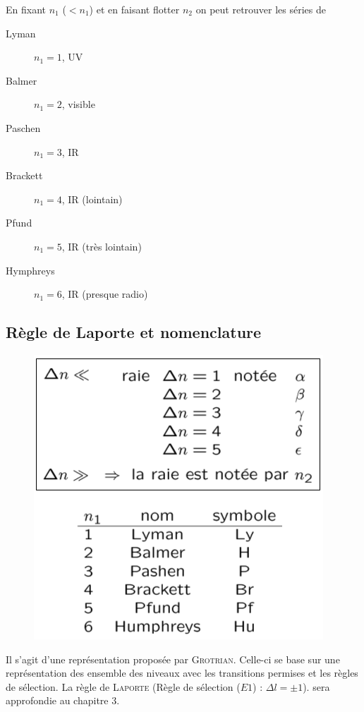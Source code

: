 En fixant $n_1$ ($< n_1$) et en faisant flotter $n_2$ on peut retrouver les séries de
\begin{multicols}{2}
\begin{description}
\item[Lyman] $n_1=1$, UV
\item[Balmer] $n_1=2$, visible
\item[Paschen] $n_1=3$, IR
\item[Brackett] $n_1=4$, IR (lointain)
\item[Pfund] $n_1=5$, IR (très lointain)
\item[Hymphreys] $n_1=6$, IR (presque radio)
\end{description}
\end{multicols}


\subsection{Règle de Laporte et nomenclature}
	\begin{figure}
	\vspace{-5mm}
	\includegraphics[scale=0.4]{ch1/image5}
	\end{figure}
Il s'agit d'une représentation proposée par \textsc{Grotrian}. Celle-ci se base sur une représentation des
ensemble des niveaux avec les transitions permises et les règles de sélection. La règle de \textsc{Laporte} 
(Règle de sélection ($E1$) : $\Delta l = \pm 1$). sera approfondie au chapitre 3. \\

